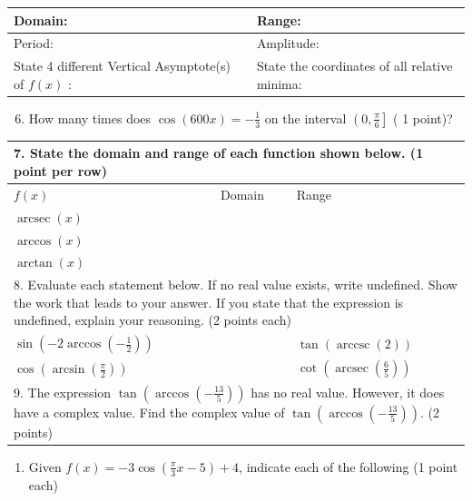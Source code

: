 \documentclass[10pt]{article}
\begin{document}
\begin{center}
\begin{tabular}{|l|l|}
\hline
Domain: & Range: \\
\hline
Period: & Amplitude: \\
\hline
State 4 different Vertical Asymptote(s) of $f(x)$ : & State the coordinates of all relative minima: \\
\hline
\end{tabular}
\end{center}

\begin{enumerate}
  \setcounter{enumi}{5}
  \item How many times does $\cos (600 x)=-\frac{1}{3}$ on the interval $\left(0, \frac{\pi}{6}\right]$ ( 1 point)?
\end{enumerate}

\begin{center}
\begin{tabular}{|l|l|l|}
\hline
\multicolumn{3}{|l|}{7. State the domain and range of each function shown below. (1 point per row)} \\
\hline
$f(x)$ & Domain & Range \\
\hline
$\operatorname{arcsec}(x)$ &  &  \\
\hline
$\arccos (x)$ &  &  \\
\hline
$\arctan (x)$ &  &  \\
\hline
\multicolumn{3}{|l|}{8. Evaluate each statement below. If no real value exists, write undefined. Show the work that leads to your answer. If you state that the expression is undefined, explain your reasoning. (2 points each)} \\
\hline
$\sin \left(-2 \arccos \left(-\frac{1}{2}\right)\right)$ &  & $\tan (\operatorname{arccsc}(2))$ \\
\hline
$\cos \left(\arcsin \left(\frac{\pi}{2}\right)\right)$ &  & $\cot \left(\operatorname{arcsec}\left(\frac{6}{5}\right)\right)$ \\
\hline
\multicolumn{3}{|l|}{9. The expression $\tan \left(\arccos \left(-\frac{13}{5}\right)\right)$ has no real value. However, it does have a complex value. Find the complex value of $\tan \left(\arccos \left(-\frac{13}{5}\right)\right)$. (2 points)} \\
\hline
\end{tabular}
\end{center}

\begin{enumerate}
  \item Given $f(x)=-3 \cos \left(\frac{\pi}{3} x-5\right)+4$, indicate each of the following (1 point each)
\end{enumerate}
\end{document}
